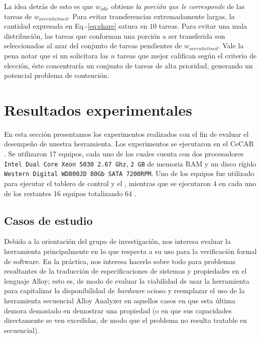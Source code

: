 La idea detrás de esto es que $w_{idle}$
obtiene \emph{la porción que le corresponde} de las tareas de
$w_{overwhelmed}$. Para evitar transferencias extremadamente largas, la
cantidad expresada en Eq.-\ref{eq:share} satura en $10$ tareas. Para evitar
una mala distribución, las tareas que conforman una porción a ser transferida
son seleccionadas al azar del conjunto de tareas pendientes de
$w_{overwhelmed}$. Vale la pena notar que si un \w solicitara las $n$ tareas que mejor califican según el criterio de elección, éste concentraría un conjunto de tareas de alta prioridad, generando un potencial problema de contención.

\section{Resultados experimentales}

En esta sección presentamos los experimentos realizados con el fin de evaluar
el desempeño de nuestra herramienta.  Los experimentos se ejecutaron en el
\cluster CeCAR \cite{cecar}. Se utilizaron 17 equipos,
cada uno de los cuales cuenta con dos procesadores \texttt{Intel Dual Core Xeon
5030 2.67 Ghz}, \texttt{2 GB} de memoria RAM y un disco rígido \texttt{Western
Digital WD800JD 80Gb SATA 7200RPM}. Uno de los equipos fue utilizado para
ejecutar el tablero de control y el \master, mientras que se ejecutaron 4 \ws
en cada uno de los restantes 16 equipos totalizando 64 \ws.


\subsection{Casos de estudio}

Debido a la orientación del grupo de investigación, nos interesa evaluar la herramienta principalmente en lo que respecta a su uso para la verificación formal de software. En la práctica, nos interesa hacerlo sobre todo para problemas resultantes de la traducción de especificaciones de sistemas y propiedades en el lenguaje Alloy; esto es, de modo de evaluar la viabilidad de usar la herramienta para capitalizar la disponibilidad de \emph{hardware} ocioso y reemplazar el uso de la herramienta secuencial Alloy Analyzer en aquellos casos en que esta última demora demasiado en demostrar una propiedad (o en que sus capacidades directamente se ven excedidas, de modo que el problema no resulta tratable en secuencial).

